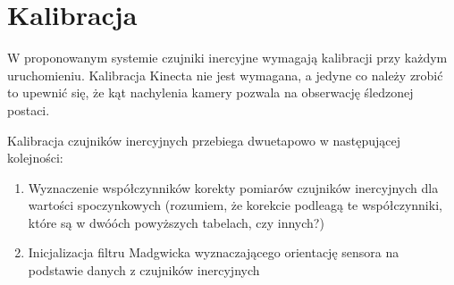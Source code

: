 \section{Kalibracja}
W proponowanym systemie czujniki inercyjne wymagają kalibracji przy każdym uruchomieniu. Kalibracja Kinecta nie jest wymagana, a jedyne co należy zrobić to upewnić się, że kąt nachylenia kamery pozwala na obserwację śledzonej postaci.

Kalibracja czujników inercyjnych przebiega dwuetapowo w następującej kolejności:
\begin{enumerate}
	\item {Wyznaczenie współczynników korekty pomiarów czujników inercyjnych dla wartości spoczynkowych} (rozumiem, że korekcie podleagą te współczynniki, które są w dwóóch powyższych tabelach, czy innych?)
	\item {Inicjalizacja filtru Madgwicka wyznaczającego orientację sensora na podstawie danych z czujników inercyjnych}
\end{enumerate}

